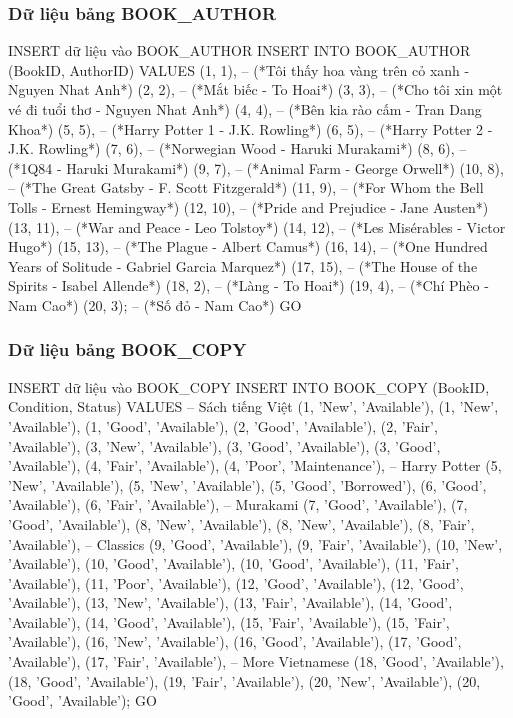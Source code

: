 \documentclass[12pt,a4paper]{article}
\begin{document}
\subsubsection{Dữ liệu bảng BOOK\_AUTHOR}

\begin{sqlcode}{INSERT dữ liệu vào BOOK_AUTHOR}
INSERT INTO BOOK_AUTHOR (BookID, AuthorID) VALUES
(1, 1),   -- (*Tôi thấy hoa vàng trên cỏ xanh - Nguyen Nhat Anh*)
(2, 2),   -- (*Mắt biếc - To Hoai*)
(3, 3),   -- (*Cho tôi xin một vé đi tuổi thơ - Nguyen Nhat Anh*)
(4, 4),   -- (*Bên kia rào cấm - Tran Dang Khoa*)
(5, 5),   -- (*Harry Potter 1 - J.K. Rowling*)
(6, 5),   -- (*Harry Potter 2 - J.K. Rowling*)
(7, 6),   -- (*Norwegian Wood - Haruki Murakami*)
(8, 6),   -- (*1Q84 - Haruki Murakami*)
(9, 7),   -- (*Animal Farm - George Orwell*)
(10, 8),  -- (*The Great Gatsby - F. Scott Fitzgerald*)
(11, 9),  -- (*For Whom the Bell Tolls - Ernest Hemingway*)
(12, 10), -- (*Pride and Prejudice - Jane Austen*)
(13, 11), -- (*War and Peace - Leo Tolstoy*)
(14, 12), -- (*Les Misérables - Victor Hugo*)
(15, 13), -- (*The Plague - Albert Camus*)
(16, 14), -- (*One Hundred Years of Solitude - Gabriel Garcia Marquez*)
(17, 15), -- (*The House of the Spirits - Isabel Allende*)
(18, 2),  -- (*Làng - To Hoai*)
(19, 4),  -- (*Chí Phèo - Nam Cao*)
(20, 3);  -- (*Số đỏ - Nam Cao*)
GO
\end{sqlcode}

\subsubsection{Dữ liệu bảng BOOK\_COPY}

\begin{sqlcode}{INSERT dữ liệu vào BOOK\_COPY}
INSERT INTO BOOK_COPY (BookID, Condition, Status) VALUES
-- Sách tiếng Việt
(1, 'New', 'Available'), (1, 'New', 'Available'), (1, 'Good', 'Available'),
(2, 'Good', 'Available'), (2, 'Fair', 'Available'),
(3, 'New', 'Available'), (3, 'Good', 'Available'), (3, 'Good', 'Available'),
(4, 'Fair', 'Available'), (4, 'Poor', 'Maintenance'),
-- Harry Potter
(5, 'New', 'Available'), (5, 'New', 'Available'), (5, 'Good', 'Borrowed'),
(6, 'Good', 'Available'), (6, 'Fair', 'Available'),
-- Murakami
(7, 'Good', 'Available'), (7, 'Good', 'Available'),
(8, 'New', 'Available'), (8, 'New', 'Available'), (8, 'Fair', 'Available'),
-- Classics
(9, 'Good', 'Available'), (9, 'Fair', 'Available'),
(10, 'New', 'Available'), (10, 'Good', 'Available'), (10, 'Good', 'Available'),
(11, 'Fair', 'Available'), (11, 'Poor', 'Available'),
(12, 'Good', 'Available'), (12, 'Good', 'Available'),
(13, 'New', 'Available'), (13, 'Fair', 'Available'),
(14, 'Good', 'Available'), (14, 'Good', 'Available'),
(15, 'Fair', 'Available'), (15, 'Fair', 'Available'),
(16, 'New', 'Available'), (16, 'Good', 'Available'),
(17, 'Good', 'Available'), (17, 'Fair', 'Available'),
-- More Vietnamese
(18, 'Good', 'Available'), (18, 'Good', 'Available'),
(19, 'Fair', 'Available'),
(20, 'New', 'Available'), (20, 'Good', 'Available');
GO
\end{sqlcode}
\end{document}
